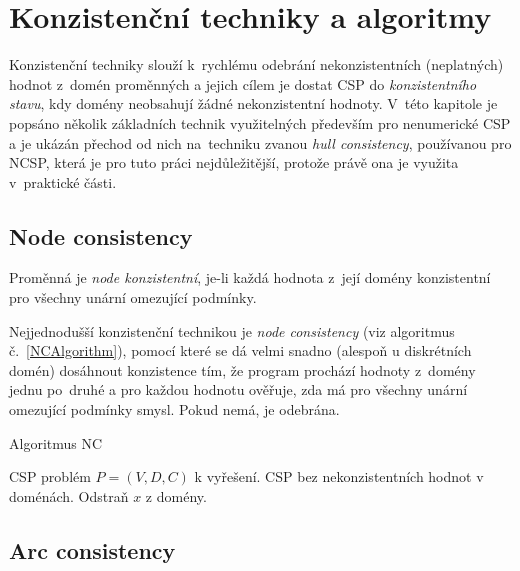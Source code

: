 \section{Konzistenční techniky a algoritmy}
Konzistenční techniky slouží k~rychlému odebrání nekonzistentních (neplatných) hodnot z~domén proměnných a jejich cílem je dostat CSP do \emph{konzistentního stavu}, kdy domény neobsahují žádné nekonzistentní hodnoty. V~této kapitole je popsáno několik základních technik využitelných především pro nenumerické CSP a je ukázán přechod od nich na~techniku zvanou \emph{hull consistency}, používanou pro NCSP, která je pro tuto práci nejdůležitější, protože právě ona je využita v~praktické části.

\subsection{Node consistency}

\begin{definition}
\label{def:nodeConsistency}
Proměnná je \emph{node konzistentní}, je-li každá hodnota z~její domény konzistentní pro všechny unární omezující podmínky.
\end{definition}

Nejjednodušší konzistenční technikou je \emph{node consistency} \cite{bartakGuide} (viz algoritmus č.~\ref{NCAlgorithm}), pomocí které se dá velmi snadno (alespoň u diskrétních domén) dosáhnout konzistence tím, že program prochází hodnoty z~domény jednu po~druhé a pro každou hodnotu ověřuje, zda má pro všechny unární omezující podmínky smysl. Pokud nemá, je odebrána.


\begin{algorithm}
\caption{Algoritmus NC}
\label{NCAlgorithm}
\begin{algorithmic}[1]
\Require CSP problém $P = (V, D, C)$ k vyřešení.
\Ensure CSP bez nekonzistentních hodnot v doménách.
\State Odstraň $x$ z domény.
\EndIf
\EndFor
\EndFor
\EndFor
\EndProcedure
\end{algorithmic}
\end{algorithm}


\subsection{Arc consistency}

